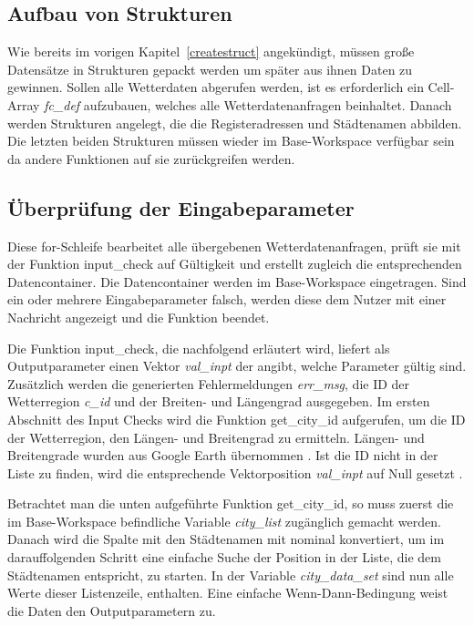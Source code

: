 \subsection{Aufbau von Strukturen} 
Wie bereits im vorigen Kapitel~\ref{createstruct} angekündigt, müssen große Datensätze in Strukturen gepackt werden um später aus ihnen Daten zu gewinnen. Sollen alle Wetterdaten abgerufen werden, ist es erforderlich ein Cell-Array \textit{fc\_def} aufzubauen, welches alle Wetterdatenanfragen beinhaltet. Danach werden Strukturen angelegt, die die Registeradressen und Städtenamen abbilden. Die letzten beiden Strukturen müssen wieder im Base-Workspace verfügbar sein da andere Funktionen auf sie zurückgreifen werden.

\subsection{Überprüfung der Eingabeparameter}
Diese for-Schleife bearbeitet alle übergebenen Wetterdatenanfragen, prüft sie mit der Funktion \textsf{input\_check} auf Gültigkeit und erstellt zugleich die entsprechenden Datencontainer. Die Datencontainer werden im Base-Workspace eingetragen. Sind ein oder mehrere Eingabeparameter falsch, werden diese dem Nutzer mit einer Nachricht angezeigt und die Funktion beendet.

Die Funktion \textsf{input\_check}, die nachfolgend erläutert wird, liefert als Outputparameter einen Vektor \textit{val\_inpt} der angibt, welche Parameter gültig sind. Zusätzlich werden die generierten Fehlermeldungen \textit{err\_msg}, die ID der Wetterregion \textit{c\_id} und der Breiten- und Längengrad ausgegeben. Im ersten Abschnitt des Input Checks wird die Funktion \textsf{get\_city\_id} aufgerufen, um die ID der Wetterregion, den Längen- und Breitengrad zu ermitteln. Längen- und Breitengrade wurden aus Google Earth übernommen \cite{googleearth}. Ist die ID nicht in der Liste zu finden, wird die entsprechende Vektorposition \textit{val\_inpt} auf Null gesetzt .

Betrachtet man die unten aufgeführte Funktion \textsf{get\_city\_id}, so muss zuerst die im Base-Workspace befindliche Variable \textit{city\_list} zugänglich gemacht werden. Danach wird die Spalte mit den Städtenamen mit \textsf{nominal} konvertiert, um im darauffolgenden Schritt eine einfache Suche der Position in der Liste, die dem Städtenamen entspricht, zu starten. In der Variable \textit{city\_data\_set} sind nun alle Werte dieser Listenzeile, enthalten. Eine einfache Wenn-Dann-Bedingung weist die Daten den Outputparametern zu.   
